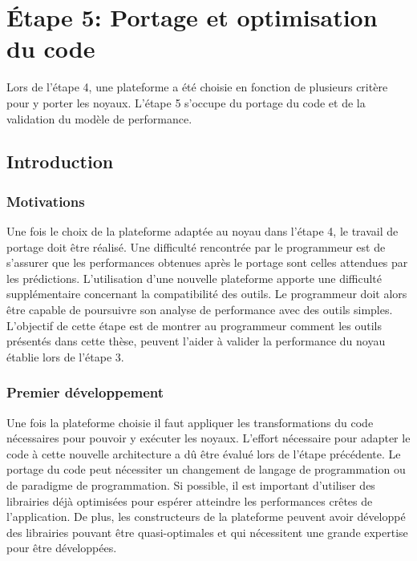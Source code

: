 \section{Étape 5: Portage et optimisation du code} \label{sec:methodo_step5}

Lors de l'étape 4, une plateforme a été choisie en fonction de plusieurs critère pour y porter les noyaux. L'étape 5 s'occupe du portage du code et de la validation du modèle de performance. 


\subsection{Introduction}

    \subsubsection{Motivations}
    Une fois le choix de la plateforme adaptée au noyau dans l'étape 4, le travail de portage doit être réalisé. 
    Une difficulté rencontrée par le programmeur est de s'assurer que les performances obtenues après le portage sont celles attendues par les prédictions. L'utilisation d'une nouvelle plateforme apporte une difficulté supplémentaire concernant la compatibilité des outils. Le programmeur doit alors être capable de poursuivre son analyse de performance avec des outils simples. 
    L'objectif de cette étape est de montrer au programmeur comment les outils présentés dans cette thèse, peuvent l'aider à valider la performance du noyau établie lors de l'étape 3.

    
    \subsubsection{Premier développement}
        Une fois la plateforme choisie il faut appliquer les transformations du code nécessaires pour pouvoir y exécuter les noyaux. L'effort nécessaire pour adapter le code à cette nouvelle architecture a dû être évalué lors de l'étape précédente. Le portage du code peut nécessiter un changement de langage de programmation ou de paradigme de programmation.
        Si possible, il est important d'utiliser des librairies déjà optimisées pour espérer atteindre les performances crêtes de l'application. De plus, les constructeurs de la plateforme peuvent avoir développé des librairies pouvant être quasi-optimales et qui nécessitent une grande expertise pour être développées.
        
